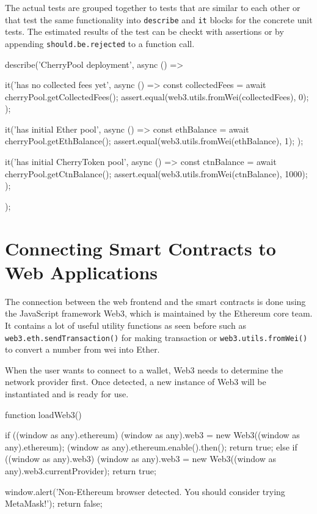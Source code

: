 The actual tests are grouped together to tests that are similar to each other or that test the same functionality into \texttt{describe} and \texttt{it} blocks for the concrete unit tests. The estimated results of the test can be checkt with assertions or by appending \texttt{should.be.rejected} to a function call.

\begin{GenericCode}
describe('CherryPool deployment', async () => {
  it('has no collected fees yet', async () => {
    const collectedFees = await cherryPool.getCollectedFees();
    assert.equal(web3.utils.fromWei(collectedFees), 0);
  });

  it('has initial Ether pool', async () => {
    const ethBalance = await cherryPool.getEthBalance();
    assert.equal(web3.utils.fromWei(ethBalance), 1);
  });

  it('has initial CherryToken pool', async () => {
    const ctnBalance = await cherryPool.getCtnBalance();
    assert.equal(web3.utils.fromWei(ctnBalance), 1000);
  });
});
\end{GenericCode}

\section{Connecting Smart Contracts to Web Applications}
The connection between the web frontend and the smart contracts is done using the JavaScript framework Web3\cite{Web3}, which is maintained by the Ethereum core team. It contains a lot of useful utility functions as seen before such as \texttt{web3.eth.sendTransaction()} for making transaction or \texttt{web3.utils.fromWei()} to convert a number from wei into Ether.

When the user wants to connect to a wallet, Web3 needs to determine the network provider first. Once detected, a new instance of Web3 will be instantiated and is ready for use.

\begin{GenericCode}
function loadWeb3() {
  if ((window as any).ethereum) {
    (window as any).web3 = new Web3((window as any).ethereum);
    (window as any).ethereum.enable().then();
    return true;
  } else if ((window as any).web3) {
    (window as any).web3 = new Web3((window as any).web3.currentProvider);
    return true;
  }

  window.alert('Non-Ethereum browser detected. You should consider trying MetaMask!');
  return false;
}	
\end{GenericCode}


